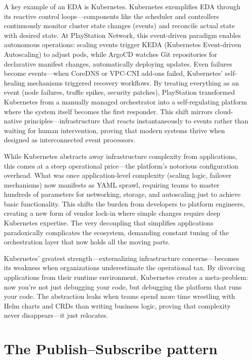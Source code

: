 \documentclass[]{final}
\begin{document}
A key example of an EDA is Kubernetes.
Kubernetes exemplifies EDA through its reactive control loops—components like
the scheduler and controllers continuously monitor cluster state changes
(events) and reconcile actual state with desired state. At PlayStation Network,
this event-driven paradigm enables autonomous operations: scaling events
trigger KEDA (Kubernetes Event-driven Autoscaling) to adjust pods, while
ArgoCD watches Git repositories for declarative manifest changes,
automatically deploying updates. Even failures become events—when CoreDNS
or VPC-CNI add-ons failed, Kubernetes' self-healing mechanisms triggered
recovery workflows. By treating everything as an event (node failures,
traffic spikes, security patches), PlayStation transformed Kubernetes
from a manually managed orchestrator into a self-regulating platform
where the system itself becomes the first responder. This shift mirrors
cloud-native principles—infrastructure that reacts instantaneously
to events rather than waiting for human intervention, proving that
modern systems thrive when designed as interconnected event processors.

While Kubernetes abstracts away infrastructure complexity from applications,
this comes at a steep operational price—the platform's notorious configuration
overhead. What was once application-level complexity (scaling logic, failover
mechanisms) now manifests as YAML sprawl, requiring teams to master hundreds of
parameters for networking, storage, and autoscaling just to achieve basic
functionality. This shifts the burden from developers to platform engineers,
creating a new form of vendor lock-in where simple changes require deep
Kubernetes expertise. The very decoupling that simplifies applications
paradoxically complicates the ecosystem, demanding constant tuning of the
orchestration layer that now holds all the moving parts.

Kubernetes' greatest strength—externalizing infrastructure concerns—becomes
its weakness when organizations underestimate the operational tax. By
divorcing applications from their runtime environment, Kubernetes creates a
meta-problem: now you're not just debugging your code, but debugging the
platform that runs your code. The abstraction leaks when teams spend more time
wrestling with Helm charts and CRDs than writing business logic, proving that
complexity never disappears—it just relocates.

\section{The Publish–Subscribe pattern}
\end{document}
